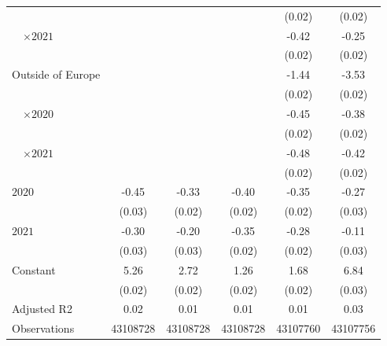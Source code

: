 \begin{tabular}{@{}l*{5}{S[table-format={-}2.2{\tnote{***}}]}@{}}
 &  &  &  & (0.02) & \vphantom{4} (0.02)\tabularnewline%
~~\(\times 2021\) &  &  &  & -0.42\tnote{***} & -0.25\tnote{***}\tabularnewline%
 &  &  &  & (0.02) & \vphantom{3} (0.02)\tabularnewline%
Outside of Europe &  &  &  & -1.44\tnote{***} & -3.53\tnote{***}\tabularnewline%
 &  &  &  & (0.02) & \vphantom{2} (0.02)\tabularnewline%
~~\(\times 2020\) &  &  &  & -0.45\tnote{***} & -0.38\tnote{***}\tabularnewline%
 &  &  &  & (0.02) & \vphantom{1} (0.02)\tabularnewline%
~~\(\times 2021\) &  &  &  & -0.48\tnote{***} & -0.42\tnote{***}\tabularnewline%
 &  &  &  & (0.02) & (0.02)\tabularnewline%
\midrule
\(2020\) & -0.45\tnote{***} & -0.33\tnote{***} & -0.40\tnote{***} & -0.35\tnote{***} & -0.27\tnote{***}\tabularnewline%
 & (0.03) & (0.02) & (0.02) & (0.02) & (0.03)\tabularnewline%
\(2021\) & -0.30\tnote{***} & -0.20\tnote{***} & -0.35\tnote{***} & -0.28\tnote{***} & -0.11\tnote{***}\tabularnewline%
 & (0.03) & (0.03) & (0.02) & (0.02) & (0.03)\tabularnewline%
Constant & 5.26\tnote{***} & 2.72\tnote{***} & 1.26\tnote{***} & 1.68\tnote{***} & 6.84\tnote{***}\tabularnewline%
 & (0.02) & (0.02) & (0.02) & (0.02) & (0.03)\tabularnewline%
\midrule
Adjusted R2 & 0.02 & 0.01 & 0.01 & 0.01 & 0.03\tabularnewline%
Observations & {\num{43108728}} & {\num{43108728}} & {\num{43108728}} & {\num{43107760}} & {\num{43107756}}\tabularnewline%
\bottomrule
\end{tabular}
